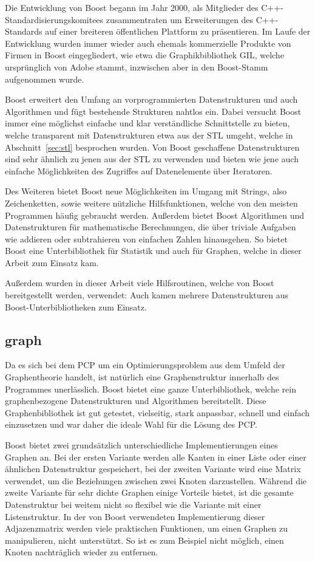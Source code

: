 Die Entwicklung von Boost begann im Jahr 2000, als Mitglieder des C++\--Standardisierungs\-komitees zusammentraten um Erweiterungen des C++-Standards auf einer breiteren öf\-fent\-li\-chen Plattform zu präsentieren.
Im Laufe der Entwicklung wurden immer wieder auch ehemals kommerzielle Produkte von Firmen in Boost eingegliedert, wie etwa die Graphikbibliothek GIL, welche ursprünglich von Adobe stammt, inzwischen
aber in den Boost-Stamm aufgenommen wurde.

Boost erweitert den Umfang an vorprogrammierten Datenstrukturen und auch Algorithmen und fügt bestehende Strukturen nahtlos ein. Dabei versucht Boost immer eine möglichst einfache und klar verständliche
Schnittstelle zu bieten, welche transparent mit Datenstrukturen etwa aus der STL umgeht, welche in Abschnitt~\ref{sec:stl} besprochen wurden. Von Boost geschaffene Datenstrukturen sind sehr ähnlich zu jenen
aus der STL zu verwenden und bieten wie jene auch einfache Möglichkeiten des Zugriffes auf Datenelemente über Iteratoren. 

Des Weiteren bietet Boost neue Möglichkeiten im Umgang mit Strings, also Zeichenketten, sowie weitere nützliche Hilfsfunktionen, welche von den meisten Programmen häufig gebraucht werden. Außerdem bietet
Boost Algorithmen und Datenstrukturen für mathematische Berechnungen, die über triviale Aufgaben wie addieren oder subtrahieren von einfachen Zahlen hinausgehen. So bietet Boost eine Unterbibliothek für 
Statistik und auch für Graphen, welche in dieser Arbeit zum Einsatz kam.

Außerdem wurden in dieser Arbeit viele Hilfsroutinen, welche von Boost bereitgestellt werden, verwendet: Auch kamen mehrere Datenstrukturen aus Boost-Unterbibliotheken zum Einsatz.

\subsection{graph}
\label{sec:boost:graph}
Da es sich bei dem PCP um ein Optimierungsproblem aus dem Umfeld der Graphentheorie handelt, ist natürlich eine Graphenstruktur innerhalb des Programmes unerlässlich. Boost bietet eine ganze Unterbibliothek, 
welche rein graphenbezogene Datenstrukturen und Algorithmen bereitstellt. Diese Graphenbibliothek ist gut getestet, vielseitig, stark anpassbar, schnell und einfach einzusetzen und war daher die ideale Wahl
für die Lösung des PCP\@.

Boost bietet zwei grundsätzlich unterschiedliche Implementierungen eines Graphen an. Bei der ersten Variante werden alle Kanten in einer Liste oder einer ähnlichen Datenstruktur gespeichert, bei
der zweiten Variante wird eine Matrix verwendet, um die Beziehungen zwischen zwei Knoten darzustellen. Während die zweite Variante für sehr dichte Graphen einige Vorteile bietet, ist die gesamte
Datenstruktur bei weitem nicht so flexibel wie die Variante mit einer Listenstruktur. In der von Boost verwendeten Implementierung dieser Adjazenzmatrix werden viele praktischen Funktionen, um einen
Graphen zu manipulieren, nicht unterstützt. So ist es zum Beispiel nicht möglich, einen Knoten nachträglich wieder zu entfernen. 

